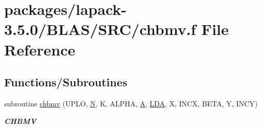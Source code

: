\hypertarget{lapack-3_85_80_2BLAS_2SRC_2chbmv_8f}{}\section{packages/lapack-\/3.5.0/\+B\+L\+A\+S/\+S\+R\+C/chbmv.f File Reference}
\label{lapack-3_85_80_2BLAS_2SRC_2chbmv_8f}
\subsection*{Functions/\+Subroutines}
\begin{DoxyCompactItemize}
\item 
subroutine \hyperlink{group__complex__blas__level2_ga426c198e1c8863d9ecbdbe16efa0f6cf}{chbmv} (U\+P\+L\+O, \hyperlink{polmisc_8c_a0240ac851181b84ac374872dc5434ee4}{N}, K, A\+L\+P\+H\+A, \hyperlink{classA}{A}, \hyperlink{example__user_8c_ae946da542ce0db94dced19b2ecefd1aa}{L\+D\+A}, X, I\+N\+C\+X, B\+E\+T\+A, Y, I\+N\+C\+Y)
\begin{DoxyCompactList}\small\item\em {\bfseries C\+H\+B\+M\+V} \end{DoxyCompactList}\end{DoxyCompactItemize}
